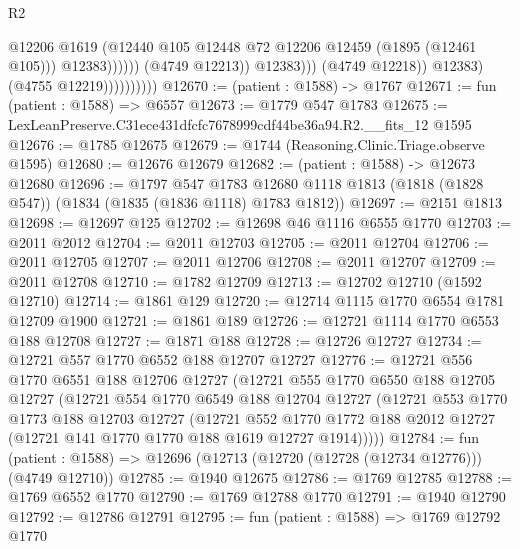 \begin{lexlean}{R2}
\begin{coremodule}
                                              @12206
                                              @1619
                                              (@12440
                                                @105
                                                @12448
                                                @72
                                                @12206
                                                @12459
                                                (@1895 (@12461 @105)))
                                              @12383))))))
                                  (@4749 @12213))
                                @12383)))
                          (@4749 @12218))
                        @12383)
                      (@4755 @12219))))))))))
@12670 := (patient : @1588) -> @1767
@12671 := fun (patient : @1588) => @6557
@12673 := @1779 @547 @1783
@12675 := LexLeanPreserve.C31ece431dfcfc7678999cdf44be36a94.R2.__fits_12 @1595
@12676 := @1785 @12675
@12679 := @1744 (Reasoning.Clinic.Triage.observe @1595)
@12680 := @12676 @12679
@12682 := (patient : @1588) -> @12673 @12680
@12696 := @1797
    @547
    @1783
    @12680
    @1118
    @1813
    (@1818 (@1828 @547))
    (@1834 (@1835 (@1836 @1118) @1783 @1812))
@12697 := @2151 @1813
@12698 := @12697 @125
@12702 := @12698 @46 @1116 @6555 @1770
@12703 := @2011 @2012
@12704 := @2011 @12703
@12705 := @2011 @12704
@12706 := @2011 @12705
@12707 := @2011 @12706
@12708 := @2011 @12707
@12709 := @2011 @12708
@12710 := @1782 @12709
@12713 := @12702 @12710 (@1592 @12710)
@12714 := @1861 @129
@12720 := @12714 @1115 @1770 @6554 @1781 @12709 @1900
@12721 := @1861 @189
@12726 := @12721 @1114 @1770 @6553 @188 @12708
@12727 := @1871 @188
@12728 := @12726 @12727
@12734 := @12721 @557 @1770 @6552 @188 @12707 @12727
@12776 := @12721
    @556
    @1770
    @6551
    @188
    @12706
    @12727
    (@12721
      @555
      @1770
      @6550
      @188
      @12705
      @12727
      (@12721
        @554
        @1770
        @6549
        @188
        @12704
        @12727
        (@12721
          @553
          @1770
          @1773
          @188
          @12703
          @12727
          (@12721
            @552
            @1770
            @1772
            @188
            @2012
            @12727
            (@12721 @141 @1770 @1770 @188 @1619 @12727 @1914)))))
@12784 := fun (patient : @1588) => @12696 (@12713 (@12720 (@12728 (@12734 @12776))) (@4749 @12710))
@12785 := @1940 @12675
@12786 := @1769 @12785
@12788 := @1769 @6552 @1770
@12790 := @1769 @12788 @1770
@12791 := @1940 @12790
@12792 := @12786 @12791
@12795 := fun (patient : @1588) => @1769 @12792 @1770

\end{coremodule}
\end{lexlean}

